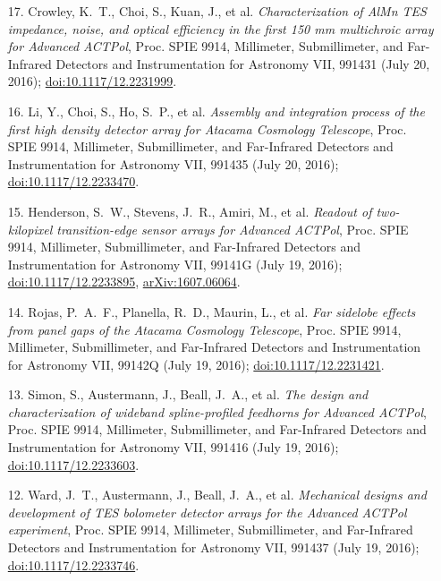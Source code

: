 \documentclass[margin,line]{res}
\begin{document}
\begin{resume}
\begin{enumerate}
\item[{17.}] Crowley, K.~T., Choi, S., Kuan, J., et al.
    \textit{Characterization of AlMn TES impedance, noise, and optical efficiency
    in the first 150 mm multichroic array for Advanced ACTPol}, Proc. SPIE 9914,
    Millimeter, Submillimeter, and Far-Infrared Detectors and Instrumentation for
    Astronomy VII, 991431 (July 20, 2016);
    \href{http://dx.doi.org/10.1117/12.2231999}{doi:10.1117/12.2231999}.
\item[{16.}] Li, Y., Choi, S., Ho, S.~P., et al. \textit{Assembly and
    integration process of the first high density detector array for Atacama
    Cosmology Telescope}, Proc. SPIE 9914, Millimeter, Submillimeter, and
    Far-Infrared Detectors and Instrumentation for Astronomy VII, 991435 (July 20,
    2016); \href{http://dx.doi.org/10.1117/12.2233470}{doi:10.1117/12.2233470}.
\item[{15.}] Henderson, S.~W., Stevens, J.~R., Amiri, M., et al.
    \textit{Readout of two-kilopixel transition-edge sensor arrays for Advanced
    ACTPol}, Proc. SPIE 9914, Millimeter, Submillimeter, and Far-Infrared Detectors
    and Instrumentation for Astronomy VII, 99141G (July 19, 2016);
    \href{http://dx.doi.org/10.1117/12.2233895}{doi:10.1117/12.2233895},
    \href{http://arxiv.org/abs/1607.06064}{arXiv:1607.06064}.
\item[{14.}] Rojas, P.~A.~F., Planella, R.~D., Maurin, L., et al. \textit{Far
    sidelobe effects from panel gaps of the Atacama Cosmology Telescope}, Proc.
    SPIE 9914, Millimeter, Submillimeter, and Far-Infrared Detectors and
    Instrumentation for Astronomy VII, 99142Q (July 19, 2016);
    \href{http://dx.doi.org/10.1117/12.2231421}{doi:10.1117/12.2231421}.
\item[{13.}] Simon, S., Austermann, J., Beall, J.~A., et al. \textit{The design
    and characterization of wideband spline-profiled feedhorns for Advanced
    ACTPol}, Proc. SPIE 9914, Millimeter, Submillimeter, and Far-Infrared Detectors
    and Instrumentation for Astronomy VII, 991416 (July 19, 2016);
    \href{http://dx.doi.org/10.1117/12.2233603}{doi:10.1117/12.2233603}.
\item[{12.}] Ward, J.~T., Austermann, J., Beall, J.~A., et al.
    \textit{Mechanical designs and development of TES bolometer detector arrays for
    the Advanced ACTPol experiment}, Proc. SPIE 9914, Millimeter, Submillimeter,
    and Far-Infrared Detectors and Instrumentation for Astronomy VII, 991437 (July
    19, 2016); \href{http://dx.doi.org/10.1117/12.2233746}{doi:10.1117/12.2233746}.

\end{enumerate}
\end{resume}
\end{document}
